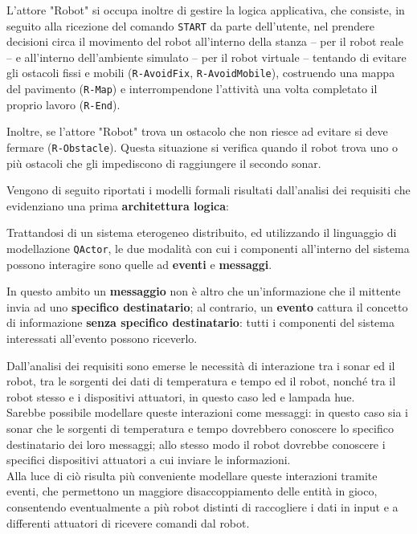 \documentclass{llncs}
\newcommand{\version}{7}
\newcommand{\action}[1]{\texttt{#1}\xspace}
\newcommand{\code}[1]{{\color{blue}\small{\texttt{#1}}}}
\begin{document}
L'attore "Robot" si occupa inoltre di gestire la logica applicativa, che consiste, in seguito alla ricezione del comando \action{START} da parte dell'utente, nel prendere decisioni circa il movimento del robot all'interno della stanza – per il robot reale – e all'interno dell'ambiente simulato – per il robot virtuale – tentando di evitare gli ostacoli fissi e mobili (\code{R-AvoidFix}, \code{R-AvoidMobile}), costruendo una mappa del pavimento (\code{R-Map}) e interrompendone l'attività una volta completato il proprio lavoro (\code{R-End}).

Inoltre, se l'attore "Robot" trova un ostacolo che non riesce ad evitare si deve fermare (\code{R-Obstacle}).
Questa situazione si verifica quando il robot trova uno o più ostacoli che gli impediscono di raggiungere il secondo sonar.



Vengono di seguito riportati i modelli formali risultati dall'analisi dei requisiti che evidenziano una prima \textbf{architettura logica}:




Trattandosi di un sistema eterogeneo distribuito, ed utilizzando il linguaggio di modellazione \action{QActor}, le due modalità con cui i componenti all'interno del sistema possono interagire sono quelle ad \textbf{eventi} e \textbf{messaggi}. 

In questo ambito un \textbf{messaggio} non è altro che un'informazione che il mittente invia ad uno \textbf{specifico destinatario}; al contrario, un \textbf{evento} cattura il concetto di informazione \textbf{senza specifico destinatario}: tutti i componenti del sistema interessati all'evento possono riceverlo. 

Dall'analisi dei requisiti sono emerse le necessità di interazione tra i sonar ed il robot, tra le sorgenti dei dati di temperatura e tempo ed il robot, nonché tra il robot stesso e i dispositivi attuatori, in questo caso led e lampada hue. \\
Sarebbe possibile modellare queste interazioni come messaggi: in questo caso sia i sonar che le sorgenti di temperatura e tempo dovrebbero conoscere lo specifico destinatario dei loro messaggi; allo stesso modo il robot dovrebbe conoscere i specifici dispositivi attuatori a cui inviare le informazioni. \\
Alla luce di ciò risulta più conveniente modellare queste interazioni tramite eventi, che permettono un maggiore disaccoppiamento delle entità in gioco, consentendo eventualmente a più robot distinti di raccogliere i dati in input e a differenti attuatori di ricevere comandi dal robot. 
\end{document}
